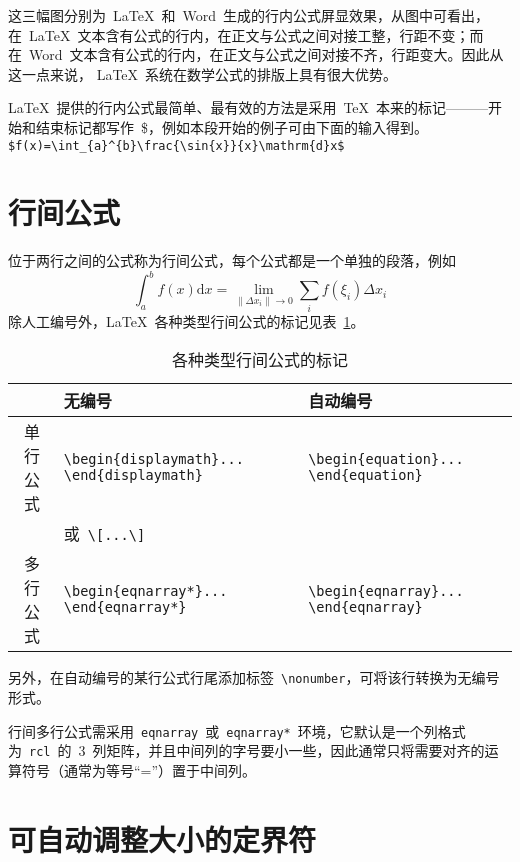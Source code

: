 这三幅图分别为~\LaTeX~和~Word~生成的行内公式屏显效果，从图中可看出，在~\LaTeX~文本含有公式的行内，在正文与公式之间对接工整，行距不变；而在~Word~文本含有公式的行内，在正文与公式之间对接不齐，行距变大。因此从这一点来说，
\LaTeX~系统在数学公式的排版上具有很大优势。

\LaTeX~提供的行内公式最简单、最有效的方法是采用~\TeX~本来的标记———开始和结束标记都写作~\$，例如本段开始的例子可由下面的输入得到。
\verb|$f(x)=\int_{a}^{b}\frac{\sin{x}}{x}\mathrm{d}x$|

\section{行间公式}
位于两行之间的公式称为行间公式，每个公式都是一个单独的段落，例如
\[\int_a^b{f\left(x\right)\mathrm{d}x}=\lim_{\left\|\Delta{x_i}\right\|\to 0}\sum_i{f\left(\xi_i\right)\Delta{x_i}}\]
除人工编号外，\LaTeX~各种类型行间公式的标记见表~\ref{tab:eqtag}。
\begin{table}[htbp]
\caption{各种类型行间公式的标记}\label{tab:eqtag}
\vspace{0.5em}\centering\wuhao
\begin{tabularx}{\textwidth}{cll}
\toprule
& 无编号 & 自动编号\\
\midrule
单行公式& \verb|\begin{displaymath}... \end{displaymath}|& \verb|\begin{equation}... \end{equation}|\\
        & 或~\verb|\[...\]| & \\
多行公式& \verb|\begin{eqnarray*}... \end{eqnarray*}|& \verb|\begin{eqnarray}... \end{eqnarray}|\\
\bottomrule
\end{tabularx}
\end{table}

另外，在自动编号的某行公式行尾添加标签~\verb|\nonumber|，可将该行转换为无编号形式。

行间多行公式需采用~\verb|eqnarray|~或~\verb|eqnarray*|~环境，它默认是一个列格式为~\verb|rcl|~的~3~列矩阵，并且中间列的字号要小一些，因此通常只将需要对齐的运算符号（通常为等号“=”）置于中间列。

\section{可自动调整大小的定界符}

